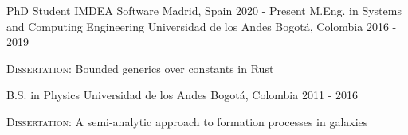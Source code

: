 

\begin{cventries}

\vspace{-1cm}
\cventry{}{}{}{}{}
\noindent
\cventry
{PhD Student} %
{IMDEA Software} %
{Madrid, Spain} %
{2020 - Present} %
{
}
\vspace{0.4cm}
\cventry
{M.Eng. in Systems and Computing Engineering} %
{Universidad de los Andes} %
{Bogotá, Colombia} %
{2016 - 2019} %
{
    \begin{cvitems}
    \item {\textsc{Dissertation:} Bounded generics over constants in Rust}
    \end{cvitems}
}
\vspace{0.4cm}
\cventry
{B.S. in Physics} %
{Universidad de los Andes} %
{Bogotá, Colombia} %
{2011 - 2016} %
{
    \begin{cvitems}
    \item {\textsc{Dissertation:} A semi-analytic approach to formation processes in galaxies}
    \end{cvitems}
}

\vspace{-0.5cm}
\end{cventries}
